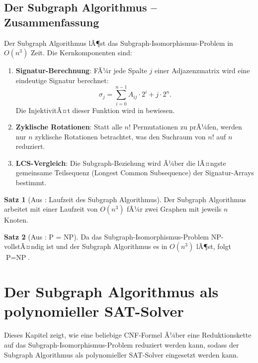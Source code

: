 ﻿\documentclass[a4paper,12pt]{article}
\theoremstyle{definition}
\newtheorem{satz}{Satz}
\begin{document}
\subsection{Der Subgraph Algorithmus -- Zusammenfassung}

Der Subgraph Algorithmus \cite{Epp26, Epp26} lÃ¶st das Subgraph-Isomorphismus-Problem in $O(n^3)$ Zeit. Die Kernkomponenten sind:

\begin{enumerate}
    \item \textbf{Signatur-Berechnung}: FÃ¼r jede Spalte $j$ einer Adjazenzmatrix wird eine eindeutige Signatur berechnet:
    \[
    \sigma_j = \sum_{i=0}^{n-1} A_{ij} \cdot 2^i + j \cdot 2^n.
    \]
    Die InjektivitÃ¤t dieser Funktion wird in \cite{Epp26} bewiesen.
    
    \item \textbf{Zyklische Rotationen}: Statt alle $n!$ Permutationen zu prÃ¼fen, werden nur $n$ zyklische Rotationen betrachtet, was den Suchraum von $n!$ auf $n$ reduziert.
    
    \item \textbf{LCS-Vergleich}: Die Subgraph-Beziehung wird Ã¼ber die lÃ¤ngste gemeinsame Teilsequenz (Longest Common Subsequence) der Signatur-Arrays bestimmt.
\end{enumerate}

\begin{satz}[Aus \cite{Epp26}: Laufzeit des Subgraph Algorithmus]
    Der Subgraph Algorithmus arbeitet mit einer Laufzeit von $O(n^3)$ fÃ¼r zwei Graphen mit jeweils $n$ Knoten.
\end{satz}

\begin{satz}[Aus \cite{Epp26}: P = NP]
    Da das Subgraph-Isomorphismus-Problem NP-vollstÃ¤ndig ist und der Subgraph Algorithmus es in $O(n^3)$ lÃ¶st, folgt $\text{P} = \text{NP}$.
\end{satz}

\section{Der Subgraph Algorithmus als polynomieller SAT-Solver}

Dieses Kapitel zeigt, wie eine beliebige CNF-Formel Ã¼ber eine Reduktionskette auf das Subgraph-Isomorphismus-Problem reduziert werden kann, sodass der Subgraph Algorithmus als polynomieller SAT-Solver eingesetzt werden kann.
\end{document}
